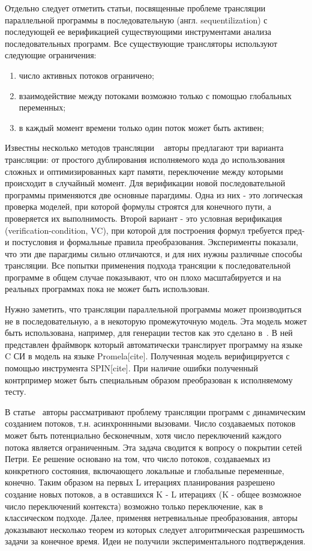 Отдельно следует отметить статьи, посвященные проблеме трансляции параллельной программы в последовательную (англ. sequentilization) с последующей ее верификацией существующими инструментами анализа последовательных программ. Все существующие трансляторы используют следующие ограничения: 
\begin{enumerate}
\item число активных потоков ограничено;
\item взаимодействие между потоками возможно только с помощью глобальных переменных;
\item в каждый момент времени только один поток может быть активен;
\end{enumerate}
Известны несколько методов трансляции ~\cite{Torre:2009, Ghafari:2010,Inverso:2014, Tomasco:2015} авторы предлагают три варианта трансляции: от простого дублирования исполняемого кода до использования сложных и оптимизированных карт памяти, переключение между которыми происходит в случайный момент.
Для верификации новой последовательной программы применяются две основные парагдимы. Одна из них - это логическая проверка моделей, при которой формулы строятся для конечного пути, а проверяется их выполнимость.
Второй вариант - это условная верификация (verification-condition, VC), при которой для построения формул требуется пред- и постусловия и формальные правила преобразования. Эксперименты показали, что эти две парагдимы сильно отличаются, и для них нужны различные способы трансляции. 
Все попытки применения подхода трансяции к последовательной программе в общем случае показывают, что он плохо масштабируется и на реальных программах пока не может быть использован. 

Нужно заметить, что трансляции параллельной программы может производиться не в последовательную, а в некоторую промежуточную модель. Эта модель может быть использована, например, для генерации тестов как это сделано в~\cite{KIM200921}. В ней представлен фраймворк который автоматически транслирует программу на языке C СИ в модель на языке Promela[cite]. Полученная модель верифицируется с помощью инструмента SPIN[cite]. При наличие ошибки полученный контрпример может быть специальным образом преобразован к исполняемому тесту.

В статье~\cite{Atig:2009} авторы рассматривают проблему трансляции программ с динамическим созданием потоков, т.н. асинхроннными вызовами. Число создаваемых потоков может быть потенциально бесконечным, хотя число переключений каждого потока является ограниченным. Эта задача сводится к вопросу о покрытии сетей Петри. Ее решение основано на том, что число потоков, создаваемых из конкретного состояния, включающего локальные и глобальные переменные, конечно. Таким образом на первых L итерациях планирования разрешено создание новых потоков, а в оставшихся K - L итерациях (K - общее возможное число переключений контекста) возможно только переключение, как в классическом подходе. Далее, применяя нетревиальные преобразования, авторы доказывают несколько теорем из которых следует алгоритмическая разрешимость задачи за конечное время.  
Идеи не получили экспериментального подтверждения.

